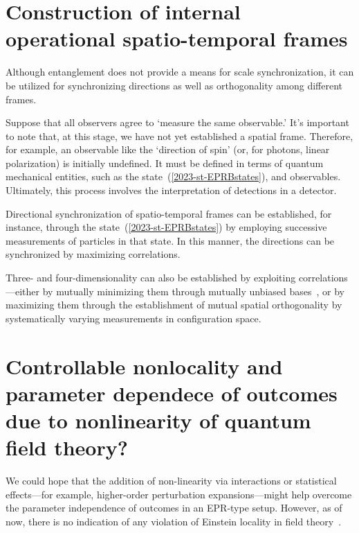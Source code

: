 \documentclass[%
  reprint,
 showpacs,
 showkeys,
 preprintnumbers,
 nofootinbib,
 amsmath,amssymb,
 aps,
 pra,
  longbibliography,
 ]{revtex4-2}
\begin{document}



\section{Construction of internal operational spatio-temporal frames}

Although entanglement does not provide a means for scale synchronization, it can be utilized for synchronizing directions as well as orthogonality among different frames.

Suppose that all observers agree to `measure the same observable.'
It's important to note that, at this stage, we have not yet established a spatial frame. Therefore, for example, an observable
like the `direction of spin' (or, for photons, linear polarization) is initially undefined.
It must be defined in terms of quantum mechanical entities, such as the state~(\ref{2023-st-EPRBstates}), and observables.
Ultimately, this process involves the interpretation of detections in a detector.

Directional synchronization of spatio-temporal frames can be established, for instance, through the state~(\ref{2023-st-EPRBstates})
by employing successive measurements of particles in that state.
In this manner, the directions can be synchronized by maximizing correlations.

Three- and four-dimensionality can also be established by exploiting correlations---either by mutually minimizing them through
mutually unbiased bases~\cite{Schwinger.60}, or by maximizing them
through the establishment of mutual spatial orthogonality by systematically varying measurements in configuration space.


\section{Controllable nonlocality and parameter dependece of outcomes due to nonlinearity of quantum field theory?}

We could hope that the addition of non-linearity via interactions or statistical effects---for example, higher-order perturbation expansions---might help overcome the parameter independence of outcomes in an EPR-type setup.
However, as of now, there is no indication of any violation of Einstein locality in field theory~\cite{shirokov,Hegerfeldt_1998,Perez_PhysRevD.16.315,Svidzinsky-PhysRevResearch.3.013202}.
\end{document}
